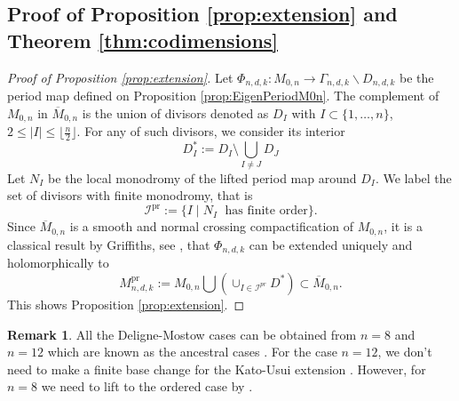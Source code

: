 \documentclass[12pt, letterpaper]{amsart}
\theoremstyle{plain}
\theoremstyle{definition}
\newtheorem{remark}[theorem]{Remark}
\begin{document}
\subsection{Proof of Proposition \ref{prop:extension} and 
Theorem \ref{thm:codimensions}
} 
\begin{proof}[Proof of Proposition \ref{prop:extension}]
Let $\Phi_{n,d,k}:M_{0,n} \to 
\Gamma_{n,d,k} \backslash D_{n,d,k}$ be the period map defined on Proposition 
\ref{prop:EigenPeriodM0n}. 
The complement of $M_{0,n}$ in $\overline{M}_{0,n}$ is the union of divisors denoted as $D_{I}$ with $I\subset \{1, \ldots,n\}$, $2 \leq |I| \leq \lfloor \frac{n}{2} \rfloor$. 
For any of such divisors, we consider its interior 
\[
D_{I}^*
:=
D_{I} \setminus \bigcup_{I \neq J} D_{J}
\]
Let $N_{I}$ be the local monodromy of the lifted period map around $D_{I}$. We label the set of divisors with finite monodromy, that is
\[
\mathcal{I}^{\mathrm{pr}} := 
\{
I \; | \;
N_{I} \; \text{ has finite order}
\}. 
\]
Since $\overline{M}_{0,n}$ is a smooth and
normal crossing compactification of $M_{0,n}$, it is a classical result by Griffiths, see  \cite[Theorem 9.5]{Gri70}, that $\Phi_{n,d,k}$ can be extended uniquely and holomorphically to 
\[
M_{n,d,k}^{\mathrm{pr}}:=M_{0,n}
\bigcup (\cup_{I \in \mathcal{I}^{pr}} D_{}^{*})
\subset
\overline{M}_{0,n}
.
\]
This shows Proposition \ref{prop:extension}.%
\end{proof}


\begin{remark}
All the Deligne-Mostow cases can be obtained from $n=8$ and $n=12$ which are known as the ancestral cases \cite{doran2004hurwitz}. For the case $n=12$, we don't need to make a finite base change for the Kato-Usui extension \cite[Thm 1.1]{gallardo2021geometric}.
However, for $n=8$ we need to lift to the ordered case by \cite{HM22}.
\end{remark}
\end{document}
